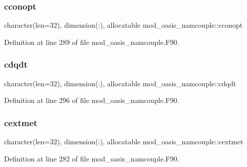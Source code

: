 \subsubsection{\texorpdfstring{cconopt}{cconopt}}
{\footnotesize\ttfamily character(len=32), dimension(\+:), allocatable mod\+\_\+oasis\+\_\+namcouple\+::cconopt\hspace{0.3cm}{\ttfamily [private]}}



Definition at line 289 of file mod\+\_\+oasis\+\_\+namcouple.\+F90.

\mbox{\label{namespacemod__oasis__namcouple_ae5b2227e6add5cbb7281030353c13a48}} 
\subsubsection{\texorpdfstring{cdqdt}{cdqdt}}
{\footnotesize\ttfamily character(len=32), dimension(\+:), allocatable mod\+\_\+oasis\+\_\+namcouple\+::cdqdt\hspace{0.3cm}{\ttfamily [private]}}



Definition at line 296 of file mod\+\_\+oasis\+\_\+namcouple.\+F90.

\mbox{\label{namespacemod__oasis__namcouple_aca9e7961bb0caa6d66fb6e4ea3b78fa9}} 
\subsubsection{\texorpdfstring{cextmet}{cextmet}}
{\footnotesize\ttfamily character(len=32), dimension(\+:), allocatable mod\+\_\+oasis\+\_\+namcouple\+::cextmet\hspace{0.3cm}{\ttfamily [private]}}



Definition at line 282 of file mod\+\_\+oasis\+\_\+namcouple.\+F90.

\mbox{\label{namespacemod__oasis__namcouple_a96bcbb80ff33c392d9dbb8d601878c95}} 
